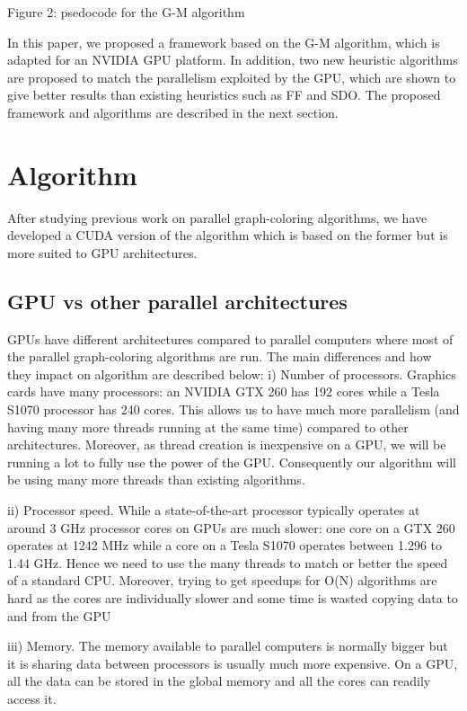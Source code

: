 \documentclass[preprint]{sigplanconf}
\begin{document}
Figure 2: psedocode for the G-M algorithm \cite{gebremedhin2006speeding} \


In this paper, we proposed a framework based on the G-M algorithm, which is adapted for an  NVIDIA GPU platform.  In addition, two new heuristic algorithms are proposed to match the parallelism exploited by the GPU, which are shown to give better results than existing heuristics such as FF and SDO. The proposed framework and algorithms are described in the next section.

\section{Algorithm}

After studying previous work on parallel graph-coloring algorithms,  we have developed a CUDA version of the algorithm which is based on the former but is more suited to GPU architectures.

\subsection{GPU vs other parallel architectures}
GPUs have different architectures compared to parallel computers where most of the parallel graph-coloring algorithms are run. The main differences and how they impact on algorithm are described below:
i) Number of processors. Graphics cards have many processors: an NVIDIA GTX 260 has 192 cores while a Tesla S1070 processor has 240 cores. This allows us to have much more parallelism (and having many more threads running at the same time) compared to other architectures. Moreover, as thread creation is inexpensive on a GPU, we will be running a lot to fully use the power of the GPU. Consequently our algorithm will be using many more threads than existing algorithms.

ii) Processor speed. While a state-of-the-art processor typically operates at around 3 GHz processor cores on GPUs are much slower: one core on a GTX 260 operates at 1242 MHz while a core on a Tesla S1070 operates between 1.296 to 1.44  GHz. Hence we need to use the many threads to match or better the speed of a standard CPU. Moreover, trying to get speedups for  O(N) algorithms are hard as the cores are individually slower and some time is wasted copying data to and from the GPU

iii) Memory. The memory available to parallel computers is normally bigger but it is sharing data between processors is usually much more expensive. On a GPU, all the data can be stored in the global memory and all the cores can readily access it.
\end{document}
